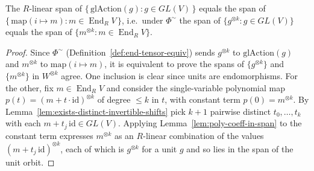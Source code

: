 \begin{lemma}
    \label{lem:units-span-eq}
    The $R$-linear span of $\{\, \mathrm{glAction}(g) : g \in GL(V) \,\}$ equals the span of
    $\{\, \mathrm{map}(i \mapsto m) : m \in \operatorname{End}_R V \,\}$, i.e.\ under $\Phi^{\sim}$ the span of
    $\{ g^{\otimes k} : g \in GL(V)\}$ equals the span of $\{ m^{\otimes k} : m \in \operatorname{End}_R V\}$.
\end{lemma}
\begin{proof}
    Since $\Phi^{\sim}$ (Definition~\ref{def:end-tensor-equiv}) sends $g^{\otimes k}$ to
    $\mathrm{glAction}(g)$ and $m^{\otimes k}$ to $\mathrm{map}(i \mapsto m)$, it is equivalent to prove
    the spans of $\{g^{\otimes k}\}$ and $\{m^{\otimes k}\}$ in $W^{\otimes k}$ agree. One inclusion is
    clear since units are endomorphisms. For the other, fix $m \in \operatorname{End}_R V$ and consider
    the single-variable polynomial map $p(t) = (m + t\cdot\mathrm{id})^{\otimes k}$ of degree $\le k$ in
    $t$, with constant term $p(0) = m^{\otimes k}$. By Lemma~\ref{lem:exists-distinct-invertible-shifts}
    pick $k+1$ pairwise distinct $t_0, \ldots, t_k$ with each $m + t_j\,\mathrm{id} \in GL(V)$. Applying
    Lemma~\ref{lem:poly-coeff-in-span} to the constant term expresses $m^{\otimes k}$ as an $R$-linear
    combination of the values $(m + t_j\,\mathrm{id})^{\otimes k}$, each of which is $g^{\otimes k}$ for a
    unit $g$ and so lies in the span of the unit orbit.
\end{proof}

